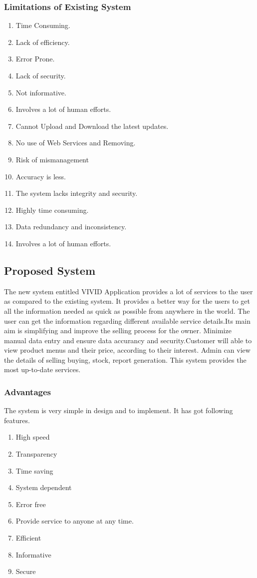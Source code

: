 \documentclass[a4paper,12pt]{article}
\begin{document}
\subsubsection{Limitations of Existing System}
\begin{enumerate}
\item Time Consuming.
\item Lack of efficiency.
\item Error Prone.
\item Lack of security.
\item Not informative.
\item Involves a lot of human efforts.
\item Cannot Upload and Download the latest updates.
\item No use of Web Services and Removing.
\item Risk of mismanagement 
\item Accuracy is less.
\item The system lacks integrity and security.
\item Highly time consuming.
\item Data redundancy and inconsistency.
\item Involves a lot of human efforts.

\end{enumerate}
\subsection{Proposed System}\vspace{5mm}
The new system entitled VIVID Application provides a lot of services to the user as compared to the existing system. It provides a better way for the users to get all the information needed as quick as possible from anywhere in the world. The user can get the information regarding different available service details.Its main  aim is simplifying and improve the selling process for the owner. Minimize manual data entry and ensure data accurancy and security.Customer will able to view product menus and their price, according to their interest. Admin can view the details of selling buying, stock, report generation. This system provides the most up-to-date services.
\subsubsection{ Advantages}
\vspace{5mm}
The system is very simple in design and to implement. It has got following features.
\begin{enumerate}
\item High speed
\item Transparency
\item Time saving
\item System dependent
\item Error free
\item Provide service to anyone at any time.
\item Efficient
\item Informative
\item Secure
\end{enumerate}
\newpage
\end{document}
